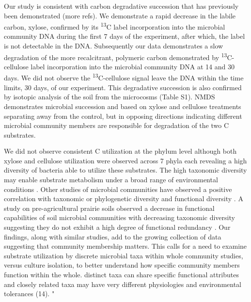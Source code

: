 Our study is consistent with carbon degradative succession that has previously been demonstrated \cite{Bastian_2009} (more refs). We demonstrate a rapid decrease in the labile carbon, xylose, confirmed by its \textsuperscript{13}C label incorporation into the microbial community DNA during the first 7 days of the experiment, after which, the label is not detectable in the DNA. Subsequently our data demonstrates a slow degradation of the more recalcitrant, polymeric carbon demonstrated by \textsuperscript{13}C-cellulose label incorporation into the microbial community DNA at 14 and 30 days. We did not observe the \textsuperscript{13}C-cellulose signal leave the DNA within the time limits, 30 days, of our experiment. This degradative succession is also confirmed by isotopic analysis of the soil from the microcosms (Table S1). NMDS demonstrates microbial succession and based on xylose and cellulose treatments separating away from the control, but in opposing directions indicating different microbial community members are responsible for degradation of the two C substrates. 

We did not observe consistent C utilization at the phylum level although both xylose and cellulose utilization were observed across 7 phyla each revealing a high diversity of bacteria able to utilize these substrates. The high taxonomic diversity may enable substrate metabolism under a broad range of environmental conditions \cite{Goldfarb_2011}. Other studies of microbial communities have observed a positive correlation with taxonomic or phylogenetic diversity and functional diversity \cite{Fierer_2012,Fierer_2013,Philippot_2010,Tringe_2005,Gilbert_2010,Bryant_2012}. A study on pre-agricultural prairie soils observed a decrease in functional capabilities of soil microbial communities with decreasing taxonomic diversity suggesting they do not exhibit a high degree of functional redundancy \cite{Fierer_2013}. Our findings, along with similar studies, add to the growing collection of data suggesting that community membership matters. This calls for a need to examine substrate utilization by discrete microbial taxa within whole community studies, versus culture isolation, to better understand how specific community members function within the whole.    
 distinct taxa can share specific functional attributes and closely related taxa may have very different physiologies and environmental tolerances (14). "\cite{Fierer_2012}





